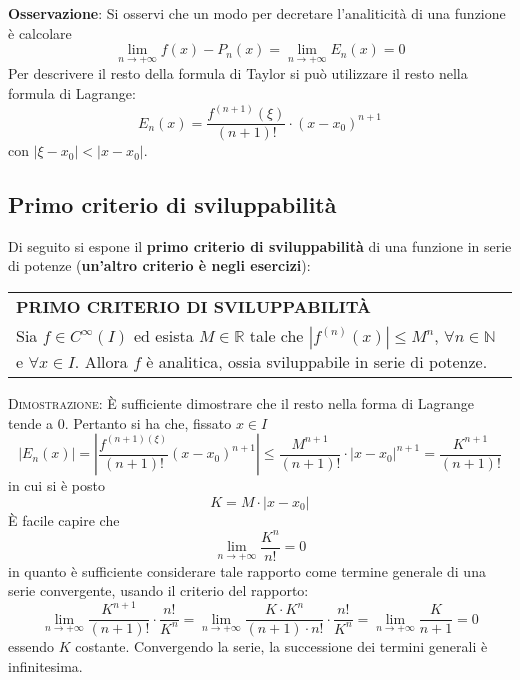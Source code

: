 \documentclass[a4paper]{extarticle}
\renewcommand\arraystretch{}
\begin{document}
\vspace{1em}
\noindent
\textbf{Osservazione}: Si osservi che un modo per decretare l'analiticità di una funzione è calcolare
\[\lim_{n \to +\infty} f(x) - P_n(x) = \lim_{n \to +\infty} E_n(x) = 0\]
Per descrivere il resto della formula di Taylor si può utilizzare il resto nella formula di Lagrange:
\[E_n(x) = \frac{f^{(n+1)}(\xi)}{(n+1)!} \cdot (x-x_0)^{n+1}\]
con $\left \vert \xi - x_0 \right \vert < \left \vert x - x_0 \right \vert$.

\vspace{1em}
\noindent
\subsection{Primo criterio di sviluppabilità}
Di seguito si espone il \textbf{primo criterio di sviluppabilità} di una funzione in serie di potenze (\textbf{un'altro criterio è negli esercizi}):

\vspace{1em}
\setlength{\tabcolsep}{14pt}
\renewcommand{\arraystretch}{2}
\noindent
\begin{tabularx}{\textwidth}{@{}|P|@{}}
    \hline
    {\textbf{PRIMO CRITERIO DI SVILUPPABILITÀ}}\\
    \parbox{\linewidth}{Sia $f \in C^\infty(I)$ ed esista $M \in \mathbb{R}$ tale che $\left \vert f^{(n)}(x) \right \vert \leq M^n$, $\forall n \in \mathbb{N}$ e $\forall x \in I$. Allora $f$ è analitica, ossia sviluppabile in serie di potenze.\vspace{3mm}}\\
    \hline
\end{tabularx}

\vspace{2em}
\noindent
\normalfont \normalsize
\textsc{Dimostrazione}: È sufficiente dimostrare che il resto nella forma di Lagrange tende a $0$. Pertanto si ha che, fissato $x \in I$
\[\left \vert E_n(x) \right \vert = \left \vert \frac{f^{(n+1)(\xi)}}{(n+1)!} (x-x_0)^{n+1} \right \vert \leq \frac{M^{n+1}}{(n+1)!} \cdot \left \vert x - x_0 \right \vert^{n+1} = \dfrac{K^{n+1}}{(n+1)!}\]
in cui si è posto
\[K = M \cdot \left \vert x-x_0 \right \vert\]
È facile capire che
\[\lim_{n \to +\infty} \dfrac{K^n}{n!} = 0\]
in quanto è sufficiente considerare tale rapporto come termine generale di una serie convergente, usando il criterio del rapporto:
\[\lim_{n \to +\infty} \dfrac{K^{n+1}}{(n+1)!} \cdot \dfrac{n!}{K^n} = \lim_{n \to +\infty} \dfrac{K \cdot K^{n}}{(n+1) \cdot n!} \cdot \dfrac{n!}{K^n} = \lim_{n\to +\infty} \dfrac{K}{n+1} = 0\]
essendo $K$ costante. Convergendo la serie, la successione dei termini generali è infinitesima.
\end{document}
